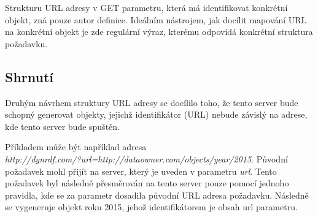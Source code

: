 \documentclass[thesis=B,czech]{FITthesis}[2012/06/26]
\begin{document}
   Strukturu URL adresy v GET parametru, která má identifikovat konkrétní objekt, zná pouze autor definice. Ideálním nástrojem, jak docílit mapování URL na konkrétní
   objekt je zde regulární výraz, kterému odpovídá konkrétní struktura požadavku.
   
\subsection{Shrnutí}
   Druhým návrhem struktury URL adresy se docílilo toho, že tento server bude schopný generovat objekty, jejichž identifikátor (URL) nebude závislý na adrese, kde tento
   server bude spuštěn.
   
   Příkladem může být například adresa \\ \textit{http://dynrdf.com/?url=http://dataowner.com/objects/year/2015}. Původní požadavek mohl přijít na server, 
   který je uveden v parametru \textit{url}. Tento požadavek byl následně přesměrován na tento server pouze pomocí jednoho pravidla, kde se za parametr dosadila 
   původní URL adresa požadavku. Následně se vygeneruje objekt roku 2015, jehož identifikátorem je obsah url parametru.

   \newpage
   
\end{document}

